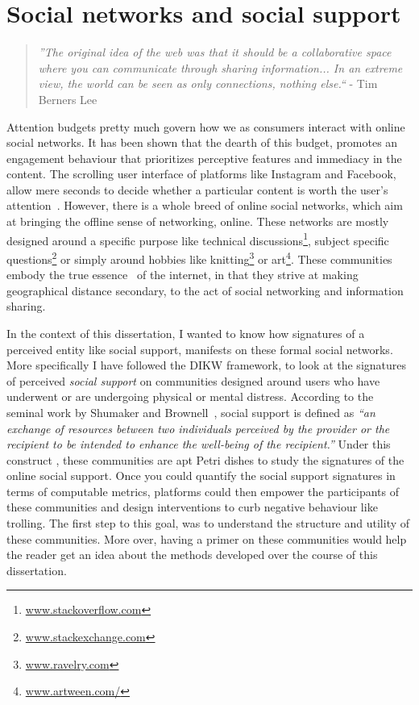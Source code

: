 
\chapter{Social networks and social support}
\graphicspath{{Chapter3/plots/} {Chapter3/plots}}
\begin{quote}
    \textit{''The original idea of the web was that it should be a collaborative space where you can communicate through sharing information... In an extreme view, the world can be seen as only connections, nothing else.``} - Tim Berners Lee\cite{berners2001weaving} 
\end{quote}
Attention budgets pretty much govern how we as consumers interact with online social networks. It has been shown that the dearth of this budget, promotes an engagement behaviour that prioritizes perceptive features and immediacy in the content. The scrolling user interface of platforms like Instagram and Facebook, allow mere seconds to decide whether a particular content is worth the user's attention~\cite{eikelboom2017irresistible}. 
However, there is a whole breed of online social networks, which aim at bringing the offline sense of networking, online. These networks are mostly designed around a specific purpose like technical discussions\footnote{\url{www.stackoverflow.com}}, subject specific questions\footnote{\url{www.stackexchange.com}} or simply around hobbies like knitting\footnote{\url{www.ravelry.com}} or art\footnote{\url{www.artween.com/}}. These communities embody the true essence~\cite{berners2001weaving} of the internet, in that they strive at making geographical distance secondary, to the act of social networking and information sharing.

In the context of this dissertation, I wanted to know how signatures of a perceived entity like social support,  manifests on these formal social networks. More specifically I have followed the DIKW framework, to look at the signatures of perceived \textsl{social support} on communities designed around users who have underwent or are undergoing physical or mental distress. According to the seminal work by Shumaker and Brownell~\cite{shumaker1984toward}, social support is defined as \textsl{``an exchange of resources between two individuals perceived by the provider or the recipient to be intended to enhance the well-being of the recipient.''}
Under this construct , these communities are apt Petri dishes to study the signatures of the online social support. Once you could quantify the social support signatures in terms of computable metrics, platforms could then empower the participants of these communities and design interventions to curb negative behaviour like trolling. The first step to this goal, was to understand the structure and utility of these communities. More over, having a primer on these communities would help the reader get an idea about the methods developed over the course of this dissertation. 

